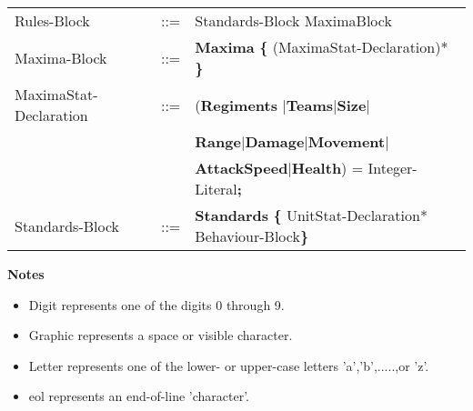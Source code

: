 \begin{center}
\begin{longtable}{ l l l }
	Rules-Block					&	::=	&Standards-Block MaximaBlock 				\\
	Maxima-Block				&	::=	&{\bf Maxima} {\bf \{} (MaximaStat-Declaration)* {\bf \}}\\
	MaximaStat-Declaration	&	::=	&({\bf Regiments }$\mid${\bf Teams}$\mid${\bf Size}$\mid$\\
								&		&{\bf Range}$\mid${\bf Damage}$\mid${\bf Movement}$\mid$\\
								&		&{\bf AttackSpeed}$\mid${\bf Health}) =  Integer-Literal{\bf ;}\\
	Standards-Block				&	::=	&{\bf Standards} {\bf \{ } UnitStat-Declaration* Behaviour-Block\bf{\} }		\\
\end{longtable}
\end{center}	
{\bf Notes}
\begin{itemize}
	\item Digit represents one of the digits 0 through 9.
	\item Graphic represents a space or visible character.
	\item Letter represents one of the lower- or upper-case letters 'a','b',.....,or 'z'.
	\item eol represents an end-of-line 'character'.
\end{itemize}
